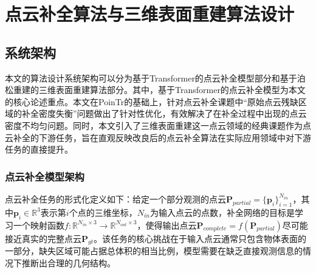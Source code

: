 \chapter{点云补全算法与三维表面重建算法设计}
\label{cha:algorithm}



\section{系统架构} %

本文的算法设计系统架构可以分为基于Transformer的点云补全模型部分和基于泊松重建的三维表面重建算法部分。其中，基于Transformer的点云补全模型为本文的核心论述重点。本文在PoinTr的基础上，针对点云补全课题中“原始点云残缺区域的补全密度失衡”问题做出了针对性优化，有效解决了在补全过程中出现的点云密度不均匀问题。同时，本文引入了三维表面重建这一点云领域的经典课题作为点云补全的下游任务，旨在直观反映改良后的点云补全算法在实际应用领域中对下游任务的直接提升。


\subsection{点云补全模型架构}

点云补全任务的形式化定义如下：给定一个部分观测的点云$\mathbf{P}_{partial} = \{\mathbf{p}_i\}_{i=1}^{N_{in}}$，其中$\mathbf{p}_i \in \mathbb{R}^3$表示第$i$个点的三维坐标，$N_{in}$为输入点云的点数，补全网络的目标是学习一个映射函数$f: \mathbb{R}^{N_{in} \times 3} \rightarrow \mathbb{R}^{N_{out} \times 3}$，使得输出点云$\mathbf{P}_{complete} = f(\mathbf{P}_{partial})$尽可能接近真实的完整点云$\mathbf{P}_{gt}$。该任务的核心挑战在于输入点云通常只包含物体表面的一部分，缺失区域可能占据总体积的相当比例，模型需要在缺乏直接观测信息的情况下推断出合理的几何结构。

